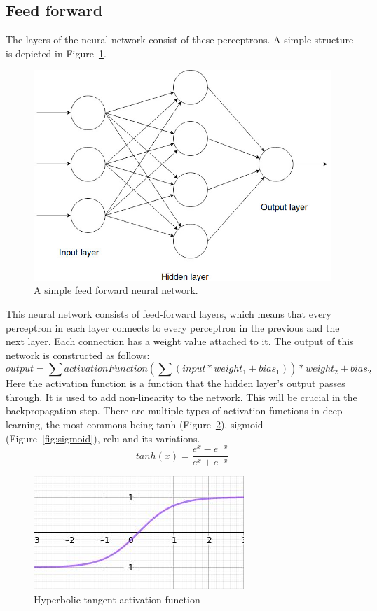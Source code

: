 \subsection{Feed forward}
The layers of the neural network consist of these perceptrons. A simple structure is depicted in Figure~\ref{fig:neural_net}.
\begin{figure}[!htb]
	\centering
	\includegraphics[scale=0.5]{simple_neural_network.jpg}
	\caption{A simple feed forward neural network.}
	\label{fig:neural_net}
\end{figure}
This neural network consists of feed-forward layers, which means that every perceptron in each layer connects to every perceptron in the previous and the next layer. Each connection has a weight value attached to it. The output of this network is constructed as follows:
\[output = \sum activationFunction(\sum(input * weight_1 + bias_1)) * weight_2 + bias_2\]
Here the activation function is a function that the hidden layer's output passes through. It is used to add non-linearity to the network. This will be crucial in the backpropagation step.
There are multiple types of activation functions in deep learning, the most commons being tanh (Figure~\ref{fig:tanh}), sigmoid (Figure~\ref{fig:sigmoid}), relu and its variations.
\[tanh(x) = \frac{e^x - e^{-x}}{e^x + e^{-x}}\]
\begin{figure}[!htb]
	\centering
	\includegraphics[scale=0.5]{tanh.jpg}
	\caption{Hyperbolic tangent activation function}
	\label{fig:tanh}
\end{figure}
